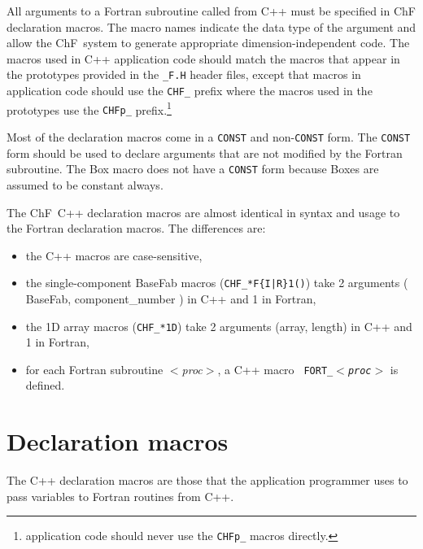 All arguments to a Fortran subroutine called from C++ must be specified in 
ChF declaration macros.  The macro names indicate the data type of the
argument and allow the ChF\ system to generate appropriate
dimension-independent code.   The macros used in C++ application code should match the
macros that appear in the prototypes provided in the {\tt *\_F.H} header
files, except that macros in application code should use the {\tt CHF\_}
prefix where the macros used in the prototypes use the {\tt CHFp\_} 
prefix.\footnote{application code should never use the {\tt CHFp\_} macros directly.}

Most of the declaration macros come in a {\tt CONST} and non-{\tt CONST}
form.  The {\tt CONST} form should be used to declare arguments that are not
modified by the Fortran subroutine.  The Box macro does not have a {\tt CONST}
form because Boxes are assumed to be constant always.

The ChF\ C++ declaration macros are almost identical in syntax and usage to
the Fortran declaration macros.  The differences are:
\begin{itemize}
\item the C++ macros are case-sensitive,
\item the single-component BaseFab macros ({\tt CHF\_*F\rm \{\tt I|R\rm \}\tt 1()})
take 2 arguments ( BaseFab, component\_number ) in C++ and 1 in Fortran,
\item the 1D array macros ({\tt CHF\_*1D}) take 2 arguments (array, length)
in C++ and 1 in Fortran,
\item for each Fortran subroutine $<${\em proc}$>$, a C++ macro {\tt
FORT\_$<${\em proc}$>$} is defined.
\end{itemize}

\section{Declaration macros}

The C++ declaration macros are those that the application programmer
uses to pass variables to Fortran routines from C++.

